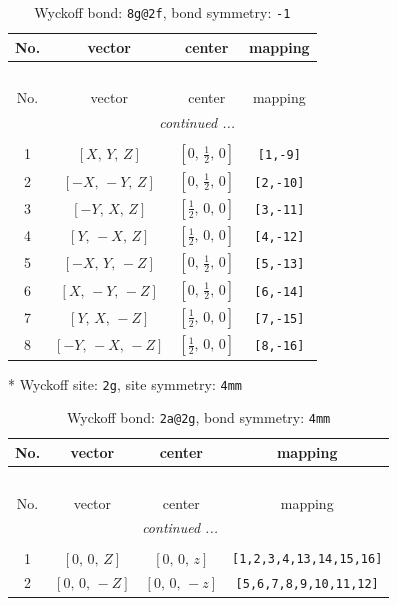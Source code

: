 \documentclass[fleqn,8pt]{jsarticle}
\begin{document}
\renewcommand{\arraystretch}{1.2}
\begin{longtable}{cccc}
\caption{Wyckoff bond: {\tt 8g@2f}, bond symmetry: {\tt -1}}
 \\
 \hline \hline
No. & vector & center & mapping \\ \hline \endfirsthead

\multicolumn{3}{l}{\tablename\ \thetable{}} \\
 \hline \hline
No. & vector & center & mapping \\ \hline \endhead

 \hline \hline
\multicolumn{3}{r}{\footnotesize\it continued ...} \\ \endfoot

 \hline \hline
\multicolumn{3}{r}{} \\ \endlastfoot

1 & $\left[ X,\, Y,\, Z \right]$ & $\left[ 0,\, \frac{1}{2},\, 0 \right]$ & {\tt [1,-9]} \\ \hline
2 & $\left[ - X,\, - Y,\, Z \right]$ & $\left[ 0,\, \frac{1}{2},\, 0 \right]$ & {\tt [2,-10]} \\ \hline
3 & $\left[ - Y,\, X,\, Z \right]$ & $\left[ \frac{1}{2},\, 0,\, 0 \right]$ & {\tt [3,-11]} \\ \hline
4 & $\left[ Y,\, - X,\, Z \right]$ & $\left[ \frac{1}{2},\, 0,\, 0 \right]$ & {\tt [4,-12]} \\ \hline
5 & $\left[ - X,\, Y,\, - Z \right]$ & $\left[ 0,\, \frac{1}{2},\, 0 \right]$ & {\tt [5,-13]} \\ \hline
6 & $\left[ X,\, - Y,\, - Z \right]$ & $\left[ 0,\, \frac{1}{2},\, 0 \right]$ & {\tt [6,-14]} \\ \hline
7 & $\left[ Y,\, X,\, - Z \right]$ & $\left[ \frac{1}{2},\, 0,\, 0 \right]$ & {\tt [7,-15]} \\ \hline
8 & $\left[ - Y,\, - X,\, - Z \right]$ & $\left[ \frac{1}{2},\, 0,\, 0 \right]$ & {\tt [8,-16]} \\
\end{longtable}
* Wyckoff site: {\tt 2g}, site symmetry: {\tt 4mm}
\renewcommand{\arraystretch}{1.2}
\begin{longtable}{cccc}
\caption{Wyckoff bond: {\tt 2a@2g}, bond symmetry: {\tt 4mm}}
 \\
 \hline \hline
No. & vector & center & mapping \\ \hline \endfirsthead

\multicolumn{3}{l}{\tablename\ \thetable{}} \\
 \hline \hline
No. & vector & center & mapping \\ \hline \endhead

 \hline \hline
\multicolumn{3}{r}{\footnotesize\it continued ...} \\ \endfoot

 \hline \hline
\multicolumn{3}{r}{} \\ \endlastfoot

1 & $\left[ 0,\, 0,\, Z \right]$ & $\left[ 0,\, 0,\, z \right]$ & {\tt [1,2,3,4,13,14,15,16]} \\ \hline
2 & $\left[ 0,\, 0,\, - Z \right]$ & $\left[ 0,\, 0,\, - z \right]$ & {\tt [5,6,7,8,9,10,11,12]} \\
\end{longtable}
\end{document}
